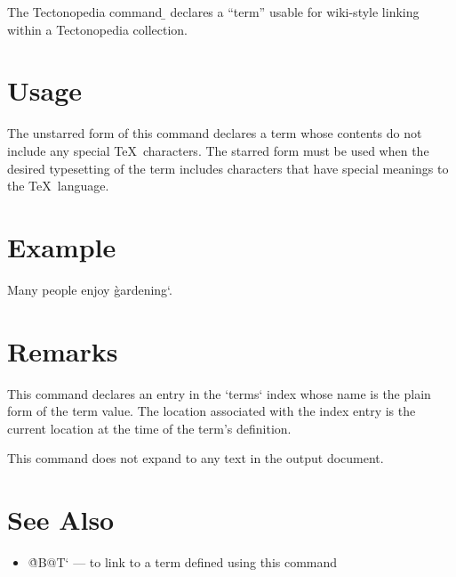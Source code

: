 
The Tectonopedia command \b{\string\DeclareTerm} declares a “term” usable for
wiki-style linking within a Tectonopedia collection.

\section*{Usage}

\begin{texdisp}
\end{texdisp}

The unstarred form of this command declares a term whose contents do not include
any special \TeX\ characters. The starred form must be used when the desired
typesetting of the term includes characters that have special meanings to the
\TeX\ language.

\section*{Example}

\begin{texdisp}

Many people enjoy \`gardening`.
\end{texdisp}

\section*{Remarks}

This command declares an entry in the \tex`terms` index whose name is the plain
form of the term value. The location associated with the index entry is the
current location at the time of the term’s definition.

This command does not expand to any text in the output document.

\section*{See Also}

\begin{itemize}
\item \`@B@T` — to link to a term defined using this command
\end{itemize}



